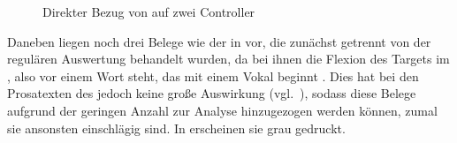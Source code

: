 \begin{figure}
\caption{Direkter Bezug von  auf zwei Controller}
\label{fig:beid2coordncao1_1}
\end{figure}

Daneben liegen noch drei Belege wie der in  vor, die
zunächst getrennt von der regulären Auswertung behandelt wurden, da bei ihnen
die Flexion des Targets im , also vor einem Wort steht, das mit
einem Vokal beginnt \autocites[vgl.][90--91]{askedal1973}[191--193,
201]{gjelsten1980}. Dies hat bei den Prosatexten des \CAO{} jedoch keine große
Auswirkung (vgl.~), sodass diese Belege aufgrund der
geringen Anzahl zur Analyse hinzugezogen werden können, zumal sie ansonsten
einschlägig sind. In  erscheinen sie grau gedruckt.

